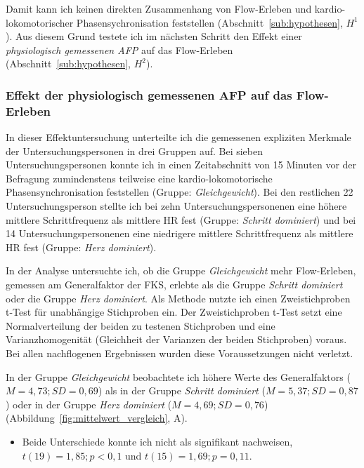 Damit kann ich keinen direkten Zusammenhang von Flow-Erleben und kardio-lokomotorischer Phasensychronisation feststellen (Abschnitt~\ref{sub:hypothesen}, $H^1$). Aus diesem Grund testete ich im nächsten Schritt den Effekt einer \emph{physiologisch gemessenen \ac{AFP}} auf das Flow-Erleben (Abschnitt~\ref{sub:hypothesen}, $H^2$).

\subsubsection{Effekt der physiologisch gemessenen \ac{AFP} auf das Flow-Erleben} 

\label{ssub:effekt_der_physiologisch_gemessenen_afp}

In dieser Effektuntersuchung unterteilte ich die gemessenen expliziten Merkmale der Untersuchungspersonen in drei Gruppen auf. Bei sieben Untersuchungspersonen konnte ich in einen Zeitabschnitt von 15 Minuten vor der Befragung zumindenstens teilweise eine kardio-lokomotorische Phasensynchronisation feststellen (Gruppe: \emph{Gleichgewicht}). Bei den restlichen 22 Untersuchungsperson stellte ich bei zehn Untersuchungspersonenen eine höhere mittlere Schrittfrequenz als mittlere HR fest (Gruppe: \emph{Schritt dominiert}) und bei 14 Untersuchungspersonenen eine niedrigere mittlere Schrittfrequenz als mittlere HR fest (Gruppe: \emph{Herz dominiert}).

In der Analyse untersuchte ich, ob die Gruppe \emph{Gleichgewicht} mehr Flow-Erleben, gemessen am Generalfaktor der \ac{FKS}, erlebte als die Gruppe \emph{Schritt dominiert} oder die Gruppe \emph{Herz dominiert}. Als Methode nutzte ich einen Zweistichproben t-Test für unabhängige Stichproben ein. Der Zweistichproben t-Test setzt eine Normalverteilung der beiden zu testenen Stichproben und eine Varianzhomogenität (Gleichheit der Varianzen der beiden Stichproben) voraus. Bei allen nachflogenen Ergebnissen wurden diese Voraussetzungen nicht verletzt. 

In der Gruppe \emph{Gleichgewicht} beobachtete ich höhere Werte des Generalfaktors ($M = 4{,}73; SD = 0{,}69$) als in der Gruppe \emph{Schritt dominiert} ($M = 5{,}37; SD = 0{,}87$) oder in der Gruppe \emph{Herz dominiert} ($M = 4{,}69; SD = 0{,}76$) (Abbildung~\ref{fig:mittelwert_vergleich}, A). 
\begin{itemize}
	
	\item Beide Unterschiede konnte ich nicht als signifikant nachweisen, $t(19) = 1{,}85; p < 0{,}1$ und $t(15) = 1{,}69; p = 0{,}11$.
\end{itemize}

